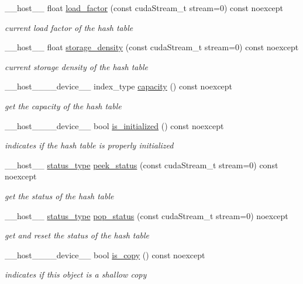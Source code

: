 \begin{DoxyCompactItemize}
\+\_\+\+\_\+host\+\_\+\+\_\+ float \hyperlink{classwarpcore_1_1MultiValueHashTable_a8abd31b493048670295af663d50d1c9e}{load\+\_\+factor} (const cuda\+Stream\+\_\+t stream=0) const noexcept
\begin{DoxyCompactList}\small\item\em current load factor of the hash table \end{DoxyCompactList}\item 
\+\_\+\+\_\+host\+\_\+\+\_\+ float \hyperlink{classwarpcore_1_1MultiValueHashTable_a7f8d4c186530fe60ead1e52f9629622c}{storage\+\_\+density} (const cuda\+Stream\+\_\+t stream=0) const noexcept
\begin{DoxyCompactList}\small\item\em current storage density of the hash table \end{DoxyCompactList}\item 
\+\_\+\+\_\+host\+\_\+\+\_\+\+\_\+\+\_\+device\+\_\+\+\_\+ index\+\_\+type \hyperlink{classwarpcore_1_1MultiValueHashTable_ae4ceca02c7bd32ee58171b5aa1ee47ff}{capacity} () const noexcept
\begin{DoxyCompactList}\small\item\em get the capacity of the hash table \end{DoxyCompactList}\item 
\+\_\+\+\_\+host\+\_\+\+\_\+\+\_\+\+\_\+device\+\_\+\+\_\+ bool \hyperlink{classwarpcore_1_1MultiValueHashTable_a44f45da1cebbcc45a01072d4d22514ba}{is\+\_\+initialized} () const noexcept
\begin{DoxyCompactList}\small\item\em indicates if the hash table is properly initialized \end{DoxyCompactList}\item 
\+\_\+\+\_\+host\+\_\+\+\_\+ \hyperlink{classwarpcore_1_1Status}{status\+\_\+type} \hyperlink{classwarpcore_1_1MultiValueHashTable_a239a45feb31e995163b4e22ec9dab446}{peek\+\_\+status} (const cuda\+Stream\+\_\+t stream=0) const noexcept
\begin{DoxyCompactList}\small\item\em get the status of the hash table \end{DoxyCompactList}\item 
\+\_\+\+\_\+host\+\_\+\+\_\+ \hyperlink{classwarpcore_1_1Status}{status\+\_\+type} \hyperlink{classwarpcore_1_1MultiValueHashTable_a2b1fca3402bf4df60eebe04e33b28d02}{pop\+\_\+status} (const cuda\+Stream\+\_\+t stream=0) noexcept
\begin{DoxyCompactList}\small\item\em get and reset the status of the hash table \end{DoxyCompactList}\item 
\+\_\+\+\_\+host\+\_\+\+\_\+\+\_\+\+\_\+device\+\_\+\+\_\+ bool \hyperlink{classwarpcore_1_1MultiValueHashTable_a5ab9221422cf32364464b44be66075dd}{is\+\_\+copy} () const noexcept
\begin{DoxyCompactList}\small\item\em indicates if this object is a shallow copy \end{DoxyCompactList}\end{DoxyCompactItemize}
